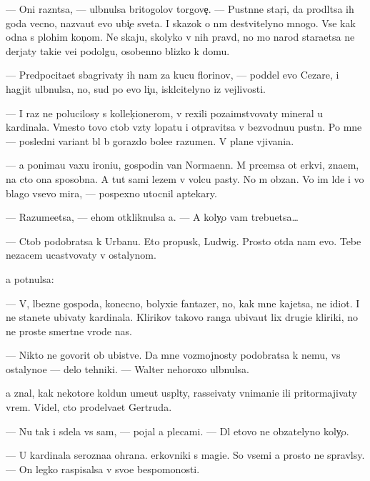 \documentclass[10pt]{book}
\begin{document}
— Oni razn{\ia}tsa, — ul{\yi}bnulsa britogolov{\yi}{\y} torgove{\c}. — Pust{\yi}nn{\yi}{\y}e star{\c}i, da prodl{\ia}tsa ih goda vecno, naz{\yi}va{\y}ut {\y}evo ubi{\y}{\c}e{\y} sveta. I skazok o n{\e}m de{\y}stvitelyno mnogo. Vse kak odna s plohim kon{\c}om. Ne skaju, skolyko v nih pravd{\yi}, no mo{\y} narod stara{\y}etsa ne derjaty taki{\y}e ve{\x}i podolgu, osobenno blizko k domu.

— Predpocita{\y}et sbagrivaty ih nam za kucu florinov, — poddel {\y}evo Cezare, i hagjit ul{\yi}bnulsa, no, sud{\ia} po {\y}evo li{\c}u, iskl{\iu}citelyno iz vejlivosti.

— I raz ne polucilosy s kollek{\c}ionerom, v{\yi} rexili poza{\y}imstvovaty mineral u kardinala. Vmesto tovo ctob{\yi} vz{\ia}ty lopatu i otpravitsa v bezvodnu{\y}u pust{\yi}n{\iu}. Po mne — posledni{\y} variant b{\yi}l b{\yi} gorazdo bole{\y}e razumen. V plane v{\yi}jivani{\y}a.

— {\Y}a ponima{\y}u vaxu ironi{\y}u, gospodin van Normaenn. M{\yi} pr{\ia}cemsa ot {\C}erkvi, zna{\y}em, na cto ona sposobna. A tut sami lezem v volc{\y}u pasty. No m{\yi} ob{\ia}zan{\yi}. Vo im{\ia} l{\iu}de{\y} i vo blago vsevo mira, — pospexno utocnil aptekary.

— Razume{\y}etsa, — ehom otkliknulsa {\y}a. — A koly{\c}o vam trebu{\y}etsa…

— Ctob{\yi} podobratsa k Urbanu. Eto propusk, Ludwig. Prosto otda{\y} nam {\y}evo. Tebe nezacem ucastvovaty v ostalynom.

{\Y}a pot{\ia}nulsa:

— V{\yi}, l{\iu}bezn{\yi}{\y}e gospoda, konecno, bolyxi{\y}e fantazer{\yi}, no, kak mne kajetsa, ne idiot{\yi}. I ne stanete ubivaty kardinala. Klirikov takovo ranga ubiva{\y}ut lix drugi{\y}e kliriki, no ne prost{\yi}{\y}e smertn{\yi}{\y}e vrode nas.

— Nikto ne govorit ob ubi{\y}stve. Da{\y} mne vozmojnosty podobratsa k nemu, vs{\e} ostalyno{\y}e — delo tehniki. — Walter nehoroxo ul{\yi}bnulsa.

{\Y}a znal, kak nekotor{\yi}{\y}e koldun{\yi} ume{\y}ut us{\yi}pl{\ia}ty, rasse{\y}ivaty vnimani{\y}e ili pritormajivaty vrem{\ia}. Videl, cto prodel{\yi}va{\y}et Gertruda.

— Nu tak i sdela{\y} vs{\e} sam, — pojal {\y}a plecami. — Dl{\ia} etovo ne ob{\ia}zatelyno koly{\c}o.

— U kardinala ser{\y}ozna{\y}a ohrana. {\C}erkovniki s magi{\y}e{\y}. So vsemi {\y}a prosto ne spravl{\iu}sy. — On legko raspisalsa v svo{\y}e{\y} bespomo{\x}nosti.
\end{document}

